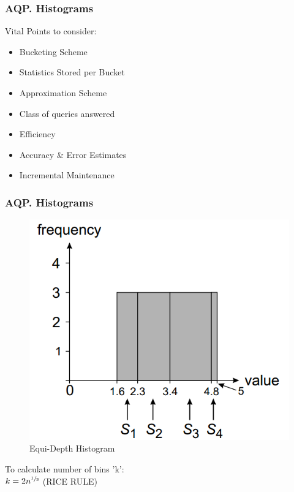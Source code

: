 \documentclass{beamer}
\begin{document}
\begin{frame}
\frametitle{AQP. Histograms}
	Vital Points to consider:
	\begin{itemize}
		\item Bucketing Scheme
		\item Statistics Stored per Bucket
		\item Approximation Scheme
		\item Class of queries answered		
		\item Efficiency
		\item Accuracy \& Error Estimates
		\item Incremental Maintenance
	\end{itemize}
\end{frame}

\begin{frame}
\frametitle{AQP. Histograms}
\begin{figure}
  \centering
  \includegraphics[scale=0.3]{img/Blinktopus-EquiDepth.png}
  \caption{Equi-Depth Histogram} 
\end{figure}

To calculate number of bins 'k':\\
	\hspace{1 cm} $k = 2n^{\sfrac{1}{3}}$ \hspace{0.4 cm} (RICE RULE)

\end{frame}
\end{document}
